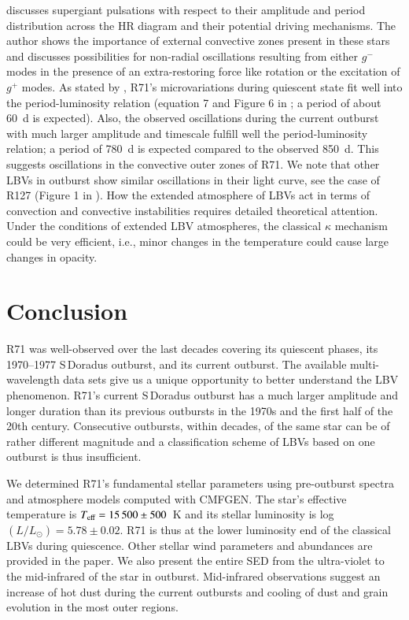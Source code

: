 \documentclass[structabstract]{aa}
\begin{document}
\citet{1980A&A....90..311M} discusses supergiant pulsations with respect to their amplitude and period distribution across the HR diagram and their potential driving mechanisms. The author shows the importance of external convective zones present in these stars and discusses possibilities for non-radial oscillations resulting from either $g^-$ modes in the presence of an extra-restoring force like rotation or the excitation of $g^+$ modes. As stated by \citet{1985A&A...153..163V}, R71's microvariations during quiescent state fit well into the period-luminosity relation (equation 7 and Figure 6 in \citealt{1980A&A....90..311M}; a period of about 60~d is expected). Also, the observed oscillations during the current outburst with much larger amplitude and timescale fulfill well the period-luminosity relation; a period of 780~d is expected compared to the observed 850~d. This suggests oscillations in the convective outer zones of R71. We note that other LBVs in outburst show similar oscillations in their light curve, see the case of R127 (Figure 1 in \citealt{2017AJ....154...15W}). How the extended atmosphere of LBVs act in terms of convection and convective instabilities requires detailed theoretical attention.  Under the conditions of extended LBV atmospheres, the classical $\kappa$ mechanism could be very efficient, i.e., minor changes in the temperature could cause large changes in opacity. 



\section{Conclusion}
\label{conclusion}

R71 was well-observed over the last decades covering its quiescent phases, its 1970--1977 S\,Doradus outburst, and its current outburst. The available multi-wavelength data sets give us a unique opportunity to better understand the LBV phenomenon. R71's current S\,Doradus outburst has a much larger amplitude and longer duration than its previous outbursts in the 1970s and the first half of the 20th century. Consecutive outbursts, within decades, of the same star can be of rather different magnitude and a classification scheme of LBVs based on one outburst is thus insufficient. 

We determined R71's fundamental stellar parameters using pre-outburst spectra and atmosphere models computed with CMFGEN. The star's effective temperature is $T_\textnormal{\scriptsize{eff}} = 15\,500 \pm 500$~K and its stellar luminosity is log$(L/L_{\odot}) = 5.78 \pm 0.02$. R71 is thus at the lower luminosity end of the classical LBVs during quiescence. Other stellar wind parameters and abundances are provided in the paper. We also present the entire SED from the ultra-violet to the mid-infrared of the star in outburst. Mid-infrared observations suggest an increase of hot dust during the current outbursts and cooling of dust and grain evolution in the most outer regions.
\end{document}
